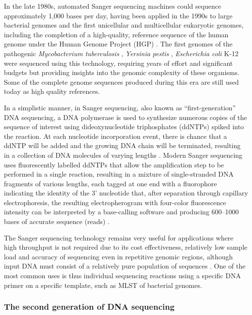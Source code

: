 In the late 1980s, automated Sanger sequencing machines could sequence approximately 1,000 bases per day, having been applied in the 1990s to large bacterial genomes and the first unicellular and multicellular eukaryotic genomes, including the completion of a high-quality, reference sequence of the human genome under the Human Genome Project (HGP) \citep{koch_sequencing_2021, collins_human_1995}. The first genomes of the pathogenic \textit{Mycobacterium tuberculosis} \citep{cole_deciphering_1998}, \textit{Yersinia pestis} \citep{parkhill_genome_2001}, \textit{Escherichia coli} K-12 \citep{blattner_complete_1997} were sequenced using this technology, requiring years of effort and significant budgets but providing insights into the genomic complexity of these organisms. Some of the complete genome sequences produced during this era are still used today as high quality references. 

In a simplistic manner, in Sanger sequencing, also known as “first-generation” DNA sequencing, a DNA polymerase is used to synthesize numerous copies of the sequence of interest using dideoxynucleotide triphosphates (ddNTPs) spiked into the reaction. At each nucleotide incorporation event, there is chance that a ddNTP will be added and the growing DNA chain will be terminated, resulting in a collection of DNA molecules of varying lengths \citep{sanger_dna_1977, hagemann_overview_2015}. Modern Sanger sequencing uses fluorescently labelled ddNTPs that allow the amplification step to be performed in a single reaction, resulting in a mixture of single-stranded DNA fragments of various lengths, each tagged at one end with a fluorophore indicating the identity of the 3' nucleotide that, after separation through capillary electrophoresis, the resulting electropherogram with four-color fluorescence intensity can be interpreted by a base-calling software and producing 600–1000 bases of accurate sequence (reads) \citep{hagemann_overview_2015}. 

The Sanger sequencing technology remains very useful for applications where high throughput is not required due to its cost effectiveness, relatively low sample load and accuracy of sequencing even in repetitive genomic regions, although input DNA must consist of a relatively pure population of sequences \citep{slatko_overview_2018}. One of the most common uses is thus individual sequencing reactions using a specific DNA primer on a specific template, such as MLST of bacterial genomes. 

\subsubsection{The second generation of DNA sequencing}

